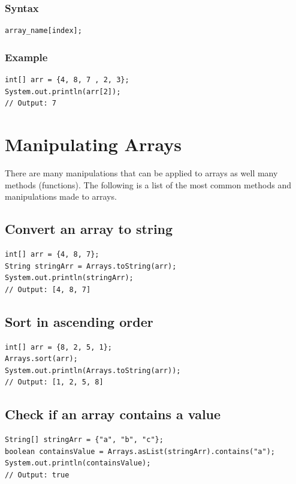 \documentclass[a4paper]{article}
\begin{document}
\subsubsection*{Syntax}
\begin{lstlisting}
array_name[index];
\end{lstlisting}

\subsubsection*{Example}
\begin{lstlisting}
int[] arr = {4, 8, 7 , 2, 3};
System.out.println(arr[2]);
// Output: 7
\end{lstlisting}

\section*{Manipulating Arrays}
There are many manipulations that can be applied to arrays as well many methods
(functions). The following is a list of the most common methods and
manipulations made to arrays.

\subsection*{Convert an array to string}
\begin{lstlisting}
int[] arr = {4, 8, 7};
String stringArr = Arrays.toString(arr);
System.out.println(stringArr);
// Output: [4, 8, 7]
\end{lstlisting}

\subsection*{Sort in ascending order}
\begin{lstlisting}
int[] arr = {8, 2, 5, 1};
Arrays.sort(arr);
System.out.println(Arrays.toString(arr));
// Output: [1, 2, 5, 8]
\end{lstlisting}

\subsection*{Check if an array contains a value}
\begin{lstlisting}
String[] stringArr = {"a", "b", "c"};
boolean containsValue = Arrays.asList(stringArr).contains("a");
System.out.println(containsValue);
// Output: true
\end{lstlisting}
\end{document}
